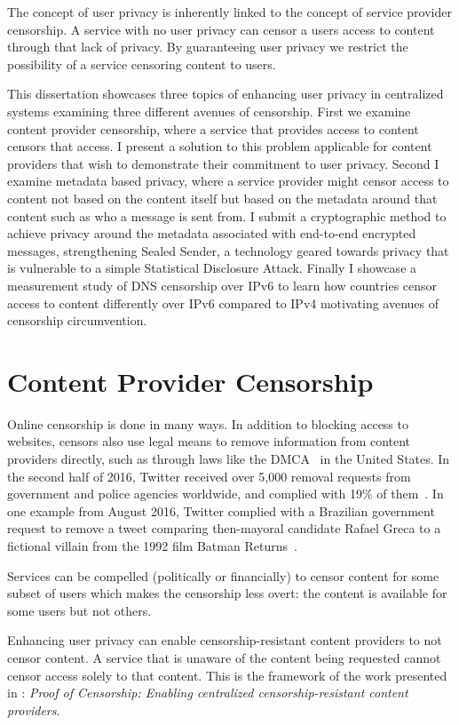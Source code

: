 The concept of user privacy is inherently linked to the concept of service
provider censorship. A service with no user privacy can censor a users access to
content through that lack of privacy. By guaranteeing user privacy we restrict
the possibility of a service censoring content to users. 

This dissertation showcases three topics of enhancing user privacy in
centralized systems examining three different avenues of censorship. First we
examine content provider censorship, where a service that provides access to
content censors that access. I present a solution to this problem applicable for
content providers that wish to demonstrate their commitment to user privacy.
Second I examine metadata based privacy, where a service provider might censor
access to content not based on the content itself but based on the metadata
around that content such as who a message is sent from. I submit a cryptographic
method to achieve privacy around the metadata associated with end-to-end
encrypted messages, strengthening Sealed Sender, a technology geared towards
privacy that is vulnerable to a simple Statistical Disclosure Attack. Finally I
showcase a measurement study of DNS censorship over IPv6 to learn how countries
censor access to content differently over IPv6 compared to IPv4 motivating
avenues of censorship circumvention.

\section{Content Provider Censorship}
Online censorship is done in many ways. In addition to blocking access to
websites, censors also use legal means to remove information from content
providers directly, such as through laws like the DMCA~\cite{dmca} in the United
States. In the second half of 2016, Twitter received over 5,000 removal requests
from government and police agencies worldwide, and complied with 19\% of
them~\cite{twitter-transparency}. In one example from August 2016, Twitter
complied with a Brazilian government request to remove a tweet comparing
then-mayoral candidate Rafael Greca to a fictional villain from the 1992 film
Batman Returns~\cite{twitter-rafael-greca}.

Services can be compelled (politically or financially) to censor content for
some subset of users which makes the censorship less overt: the content is
available for some users but not others. 

Enhancing user privacy can enable censorship-resistant content providers to not
censor content. A service that is unaware of the content being requested cannot
censor access solely to that content. This is the framework of the work
presented in : \emph{Proof of Censorship: Enabling centralized
censorship-resistant content providers}.

